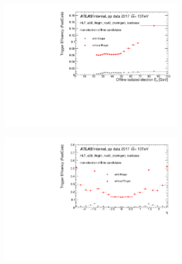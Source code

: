 \begin{figure}[h!tb]
  \begin{center}
  \begin{subfigure}[c]{.48\textwidth}
  \centering
  \includegraphics[width=\textwidth]{sections/operation/figures/efficiencies/eff_EGAM7_e28_ringer_and_noringer_2017_after_ts1_L2Calo_et.pdf}
  \caption{}
  \end{subfigure}
  \hfill
  \begin{subfigure}[c]{.48\textwidth}
  \centering
  \includegraphics[width=\textwidth]{sections/operation/figures/efficiencies/eff_EGAM7_e28_ringer_and_noringer_2017_after_ts1_L2Calo_eta.pdf}
  \caption{}
  \end{subfigure}\\

\end{center}
\end{figure}
